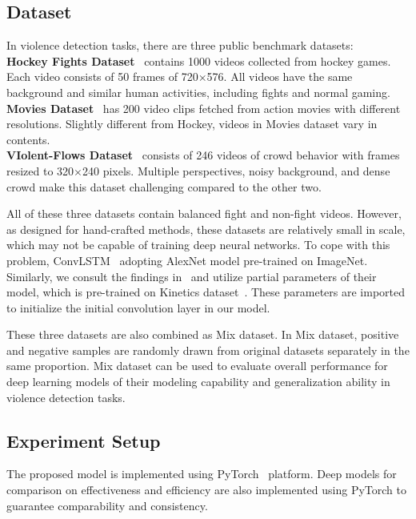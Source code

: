 \documentclass[10pt,twocolumn,letterpaper]{article}
\begin{document}
\subsection{Dataset}

In violence detection tasks, there are three public benchmark datasets: \\
\textbf{Hockey Fights Dataset}~\cite{hockey} contains 1000 videos collected from hockey games.
Each video consists of 50 frames of 720$\times$576. 
All videos have the same background and similar human activities, including fights and normal gaming. \\
\textbf{Movies Dataset}~\cite{hockey} has 200 video clips fetched from action movies with different resolutions. Slightly different from Hockey, videos in Movies dataset vary in contents.\\
\textbf{VIolent-Flows Dataset}~\cite{vif} consists of 246 videos of crowd behavior with frames resized to 320$\times$240 pixels.
Multiple perspectives, noisy background, and dense crowd make this dataset challenging compared to the other two.

All of these three datasets contain balanced fight and non-fight videos. 
However, as designed for hand-crafted methods, these datasets are relatively small in scale, which may not be capable of training deep neural networks.
To cope with this problem, ConvLSTM~\cite{convlstm_sudh} adopting AlexNet model pre-trained on ImageNet.
Similarly, we consult the findings in~\cite{3dcnn_2} and utilize partial parameters of their model, which is pre-trained on Kinetics dataset~\cite{kinetics}.
These parameters are imported to initialize the initial convolution layer in our model.

These three datasets are also combined as Mix dataset.
In Mix dataset, positive and negative samples are randomly drawn from original datasets separately in the same proportion.
Mix dataset can be used to evaluate overall performance for deep learning models of their modeling capability and generalization ability in violence detection tasks.

\subsection{Experiment Setup}

The proposed model is implemented using PyTorch~\cite{pytorch} platform. 
Deep models for comparison on effectiveness and efficiency are also implemented using PyTorch to guarantee comparability and consistency.
\end{document}
